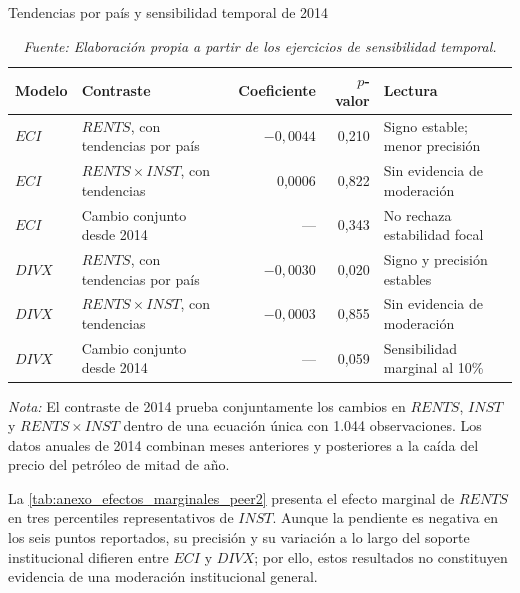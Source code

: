 \documentclass[../../TFM.tex]{subfiles}
\begin{document}
	\begin{table}[htbp]
		\centering
		\small
		\caption{Tendencias por país y sensibilidad temporal de 2014}
		\label{tab:anexo_tendencias_2014_peer2}
		\begin{adjustbox}{max width=\textwidth}
		\begin{tabular}{llrrl}
			\toprule
			Modelo & Contraste & Coeficiente & $p$-valor & Lectura \\
			\midrule
			$ECI$ & $RENTS$, con tendencias por país & $-0,0044$ & 0,210 & Signo estable; menor precisión \\
			$ECI$ & $RENTS\times INST$, con tendencias & 0,0006 & 0,822 & Sin evidencia de moderación \\
			$ECI$ & Cambio conjunto desde 2014 & --- & 0,343 & No rechaza estabilidad focal \\
			\addlinespace
			$DIVX$ & $RENTS$, con tendencias por país & $-0,0030$ & 0,020 & Signo y precisión estables \\
			$DIVX$ & $RENTS\times INST$, con tendencias & $-0,0003$ & 0,855 & Sin evidencia de moderación \\
			$DIVX$ & Cambio conjunto desde 2014 & --- & 0,059 & Sensibilidad marginal al 10\% \\
			\bottomrule
		\end{tabular}
		\end{adjustbox}
		\caption*{\footnotesize \textit{Nota:} El contraste de 2014 prueba conjuntamente los cambios en $RENTS$, $INST$ y $RENTS\times INST$ dentro de una ecuación única con 1.044 observaciones. Los datos anuales de 2014 combinan meses anteriores y posteriores a la caída del precio del petróleo de mitad de año.}
		\caption*{\footnotesize \textit{Fuente: Elaboración propia a partir de los ejercicios de sensibilidad temporal.}}
	\end{table}

	La \autoref{tab:anexo_efectos_marginales_peer2} presenta el efecto marginal
	de $RENTS$ en tres percentiles representativos de $INST$. Aunque la pendiente
	es negativa en los seis puntos reportados, su precisión y su variación a lo
	largo del soporte institucional difieren entre $ECI$ y $DIVX$; por ello, estos
	resultados no constituyen evidencia de una moderación institucional general.
\end{document}
